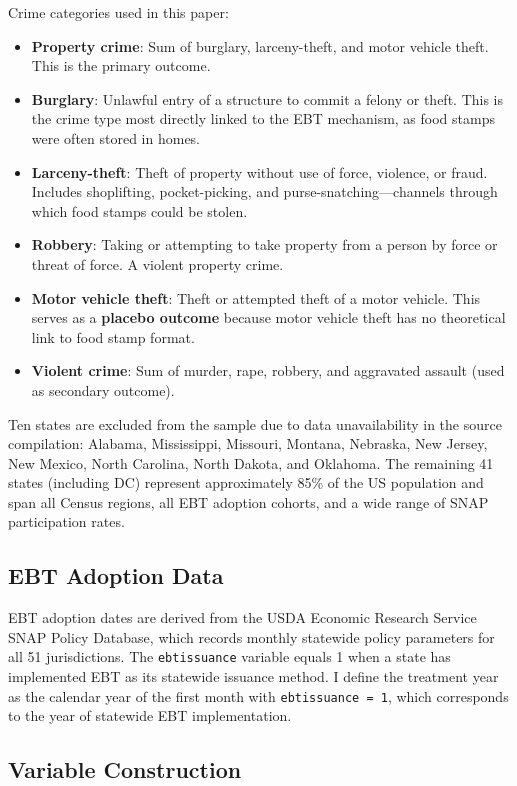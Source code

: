 \documentclass[12pt]{article}
\begin{document}
Crime categories used in this paper:
\begin{itemize}
\item \textbf{Property crime}: Sum of burglary, larceny-theft, and motor vehicle theft. This is the primary outcome.
\item \textbf{Burglary}: Unlawful entry of a structure to commit a felony or theft. This is the crime type most directly linked to the EBT mechanism, as food stamps were often stored in homes.
\item \textbf{Larceny-theft}: Theft of property without use of force, violence, or fraud. Includes shoplifting, pocket-picking, and purse-snatching---channels through which food stamps could be stolen.
\item \textbf{Robbery}: Taking or attempting to take property from a person by force or threat of force. A violent property crime.
\item \textbf{Motor vehicle theft}: Theft or attempted theft of a motor vehicle. This serves as a \textbf{placebo outcome} because motor vehicle theft has no theoretical link to food stamp format.
\item \textbf{Violent crime}: Sum of murder, rape, robbery, and aggravated assault (used as secondary outcome).
\end{itemize}

Ten states are excluded from the sample due to data unavailability in the source compilation: Alabama, Mississippi, Missouri, Montana, Nebraska, New Jersey, New Mexico, North Carolina, North Dakota, and Oklahoma. The remaining 41 states (including DC) represent approximately 85\% of the US population and span all Census regions, all EBT adoption cohorts, and a wide range of SNAP participation rates.

\subsection{EBT Adoption Data}

EBT adoption dates are derived from the USDA Economic Research Service SNAP Policy Database, which records monthly statewide policy parameters for all 51 jurisdictions. The \texttt{ebtissuance} variable equals 1 when a state has implemented EBT as its statewide issuance method. I define the treatment year as the calendar year of the first month with \texttt{ebtissuance = 1}, which corresponds to the year of statewide EBT implementation.

\subsection{Variable Construction}
\end{document}
